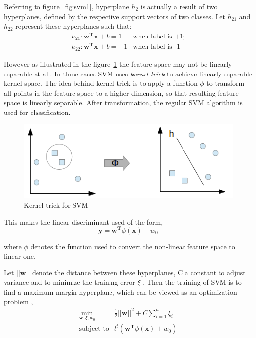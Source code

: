 Referring to figure~\ref{fig:svm1}, hyperplane $h_2$ is actually a result of two hyperplanes, defined by the respective support vectors of two classes. Let $h_{21}$ and $h_{22}$ represent these hyperplanes	such that:
\[\begin{array}{ll} 
h_{21}: \boldsymbol{w^T}\boldsymbol{x} + b = 1 & \mbox{when label is +1};\\
h_{22}: \boldsymbol{w^T}\boldsymbol{x} + b = -1 & \mbox{when label is -1}
\end{array} \]

However as illustrated in the figure~\ref{fig:svm2} the feature space may not be linearly separable at all. In these cases SVM uses \emph{kernel trick} to achieve linearly separable kernel space. The idea behind kernel trick is to apply a function $\phi$ to transform all points in the feature space to a higher dimension, so that resulting feature space is linearly separable. After transformation, the regular SVM algorithm is used for classification.

\begin{figure}[h]
  \begin{center}
    \captionsetup{justification=centering}
    \includegraphics[scale=0.50]{figures/svm2.png}
    \caption{Kernel trick for SVM}
    \label{fig:svm2}
  \end{center}
\end{figure}

This makes the linear discriminant used of the form,
\[\boldsymbol{y} = \boldsymbol{w^T}\phi(\boldsymbol{x}) + w_0 \]

where $\phi$ denotes the function used to convert the non-linear feature space to linear one.

Let $||\boldsymbol{w}||$ denote the distance between these hyperplanes, C a constant to adjust variance and to minimize the training error $\xi$ . Then the training of SVM is to find a maximum margin hyperplane, which can be viewed as an optimization problem \cite{Vapnik1995, Chang2011},
\[\begin{array}{ll} 
 \min\limits_{\boldsymbol{w},\xi,w_0} &\frac{1}{2} ||\boldsymbol{w}||^2 + C \sum\limits_{i=1}^n \xi_i \\
 \mbox{subject to} & l^t(\boldsymbol{w^T}\phi(\boldsymbol{x}) + w_0) 
\end{array}\]

